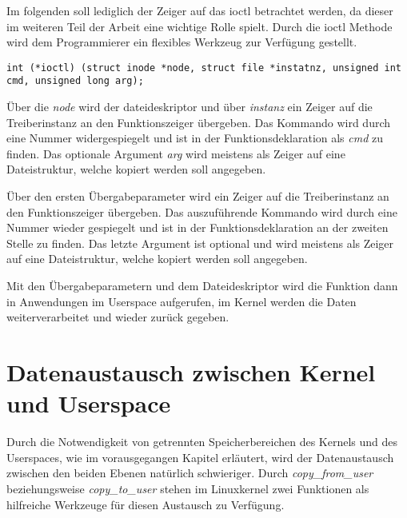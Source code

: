 Im folgenden soll lediglich der Zeiger auf das \acf{ioctl} betrachtet werden, da dieser im weiteren Teil der Arbeit eine wichtige Rolle spielt.
Durch die \ac{ioctl} Methode wird dem Programmierer ein flexibles Werkzeug zur Verfügung gestellt. 

\begin{lstfloat}
\begin{lstlisting}
int (*ioctl) (struct inode *node, struct file *instatnz, unsigned int cmd, unsigned long arg);
\end{lstlisting}
\end{lstfloat}

Über die \textit{node} wird der \gls{dateideskriptor} und über \textit{instanz} ein Zeiger auf die Treiberinstanz an den Funktionszeiger übergeben. Das Kommando wird durch eine Nummer widergespiegelt und ist in der Funktionsdeklaration als \textit{cmd} zu finden. Das optionale Argument \textit{arg} wird meistens als Zeiger auf eine Dateistruktur, welche kopiert werden soll angegeben. \citep[S. 249f.]{schroder2009embedded} %


Über den ersten Übergabeparameter wird ein Zeiger auf die Treiberinstanz an den Funktionszeiger übergeben. Das auszuführende Kommando wird durch eine Nummer wieder gespiegelt und ist in der Funktionsdeklaration an der zweiten Stelle zu finden. Das letzte Argument ist optional und wird meistens als Zeiger auf eine Dateistruktur, welche kopiert werden soll angegeben. \citep[S. 90f.]{corbet2005linux} %


Mit den Übergabeparametern und dem Dateideskriptor wird die Funktion dann in Anwendungen im Userspace aufgerufen, im Kernel werden die Daten weiterverarbeitet und wieder zurück gegeben.

\section{Datenaustausch zwischen Kernel und Userspace}
Durch die Notwendigkeit von getrennten Speicherbereichen des Kernels und des Userspaces, wie im vorausgegangen Kapitel erläutert, wird der Datenaustausch zwischen den beiden Ebenen natürlich schwieriger. Durch \textit{copy\_from\_user} beziehungsweise \textit{copy\_to\_user} stehen im Linuxkernel zwei Funktionen als hilfreiche Werkzeuge für diesen Austausch zu Verfügung.


